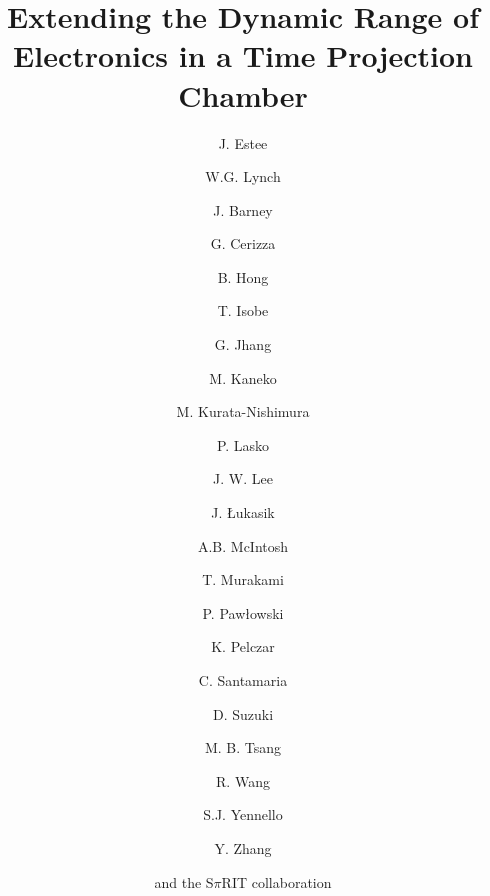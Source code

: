 \documentclass[review]{elsarticle}
\begin{document}
\begin{frontmatter}

\title{Extending the Dynamic Range of Electronics in a Time Projection Chamber}


\author[nscl,msu]{J. Estee}
\author[nscl,msu]{W.G. Lynch}
\author[nscl,msu]{J. Barney}
\author[nscl,msu]{G. Cerizza}
\author[kor]{B. Hong}
\author[riken]{T. Isobe}
\author[nscl]{G. Jhang}
\author[kyoto]{M. Kaneko}
\author[riken]{M. Kurata-Nishimura}
\author[krakow]{P. Lasko}
\author[kor]{J. W. Lee}
\author[krakow]{J. \L ukasik}
\author[a&m]{A.B. McIntosh}
\author[kyoto]{T. Murakami}
\author[krakow]{P. Paw\l owski}
\author[poland]{K. Pelczar}
\author[nscl]{C. Santamaria}
\author[riken]{D. Suzuki}
\author[nscl]{M. B. Tsang}
\author[china1,china2]{R. Wang}
\author[a&m]{S.J. Yennello}
\author[tsing]{Y. Zhang}
\author[]{and the S$\pi$RIT collaboration}

\address[nscl]{National Superconducting Cyclotron Laboratory, East Lansing, Michigan, 48824, USA}
\address[msu]{Department of Physics and Astronomy, Michigan State University, East Lansing, Michigan, 48824, USA }
\address[kor]{Department of Physics, Korea University, Seoul 136-703, Republic of Korea }
\address[riken]{RIKEN Nishina Center, Hirosawa 2-1, Wako, Saitama 351‐0198, Japan }
\address[kyoto]{Department of Physics, Kyoto University, Kita-shirakawa, Kyoto 606-8502, Japan }
\address[krakow]{Institute of Nuclear Physics PAN, ul. Radzikowskiego 15231-342 Krak\'{o}w, Poland}
\address[a&m]{Cyclotron Institute, Texas A$\&$M University, College Station, TX 77843, USA }
\address[tsing]{Department of Physics, Tsinghua University, Beijing 100084, P. R. China}
\address[poland]{Faculty of Physics, Astronomy and Applied Computer Science, Jagiellonian University, ul. Go\l \k{e}bia 24, 31-007 Krak\'{o}w}
\address[china1]{State Key Laboratory of Radiation Medicine and Protection, School of Radiation Medicine and Protection, Soochow University, Suzhou 215123, China}
\address[china2]{Collaborative Innovation Center of Radiological Medicine of Jiangsu Higher Education Institutions, Suzhou 215123, China}



\begin{abstract}


\end{abstract}
\end{frontmatter}
\end{document}
